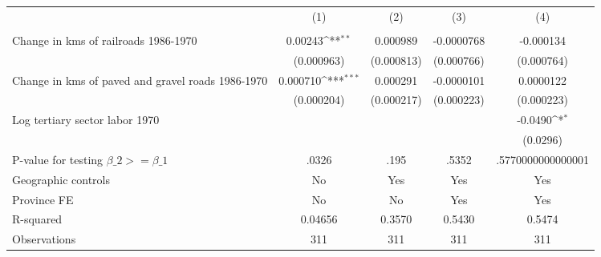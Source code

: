{
\def\sym#1{\ifmmode^{#1}\else\(^{#1}\)\fi}
\begin{tabular}{l*{4}{c}}
\hline\hline
                &\multicolumn{1}{c}{(1)}&\multicolumn{1}{c}{(2)}&\multicolumn{1}{c}{(3)}&\multicolumn{1}{c}{(4)}\\
                &\multicolumn{1}{c}{}&\multicolumn{1}{c}{}&\multicolumn{1}{c}{}&\multicolumn{1}{c}{}\\
\hline
Change in kms of railroads 1986-1970&  0.00243\sym{**} & 0.000989         &-0.0000768         &-0.000134         \\
                &(0.000963)         &(0.000813)         &(0.000766)         &(0.000764)         \\
[1em]
Change in kms of paved and gravel roads 1986-1970& 0.000710\sym{***}& 0.000291         &-0.0000101         &0.0000122         \\
                &(0.000204)         &(0.000217)         &(0.000223)         &(0.000223)         \\
[1em]
Log tertiary sector labor 1970&                  &                  &                  &  -0.0490\sym{*}  \\
                &                  &                  &                  & (0.0296)         \\
\hline
P-value for testing $\beta\_{2} >= \beta\_{1}$&    .0326         &     .195         &    .5352         &.5770000000000001         \\
Geographic controls&       No         &      Yes         &      Yes         &      Yes         \\
Province FE     &       No         &       No         &      Yes         &      Yes         \\
R-squared       &  0.04656         &   0.3570         &   0.5430         &   0.5474         \\
Observations    &      311         &      311         &      311         &      311         \\
\hline\hline
\end{tabular}
}
